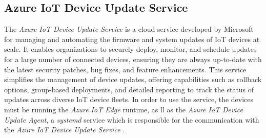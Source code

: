 \subsection{Azure IoT Device Update Service}
The \textit{Azure IoT Device Update Service} is a cloud service developed by Microsoft
for managing and automating the firmware and system updates of \ac{IoT} devices at scale.
It enables organizations to securely deploy, monitor, and schedule updates for
a large number of connected devices, ensuring they are always up-to-date with
the latest security patches, bug fixes, and feature enhancements. This service
simplifies the management of device updates, offering capabilities such as
rollback options, group-based deployments, and detailed reporting to track the
status of updates across diverse \ac{IoT} device fleets. In order to use the service,
the devices must be running the \textit{Azure IoT Edge} runtime, as ll as the
\textit{Azure IoT Device Update Agent}, a \textit{systemd} service which is
responsible for the communication with the \textit{Azure IoT Device Update Service}
\cite{msdoc-adu}.


